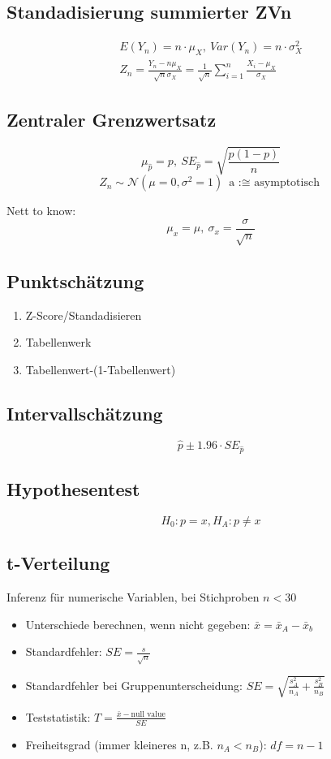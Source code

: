 \documentclass[10pt,a4paper,landscape]{article}
\begin{document}
\begin{multicols}{4}
\subsection{Standadisierung summierter ZVn}
\begin{align*}
E(Y_n) = n \cdot \mu_X, ~ Var(Y_n)= n \cdot \sigma_X^2 \\
Z_n = \frac{Y_n - n\mu_X}{\sqrt{n}\sigma_X}=\frac{1}{\sqrt{n}}\sum_{i=1}^n \frac{X_i-\mu_X}{\sigma_X}
\end{align*}

\subsection{Zentraler Grenzwertsatz}
\[
\mu_{\hat{p}}=p, ~SE_{\hat{p}}=\sqrt{\frac{p(1-p)}{n}}
\]
\[
Z_n \sim \mathcal{N}(\mu = 0, \sigma^2 = 1) ~ \text{a :$\cong$ asymptotisch}
\]

Nett to know:
\[
\mu_x = \mu, ~ \sigma_x = \frac{\sigma}{\sqrt{n}}
\]

\subsection{Punktschätzung}
\begin{enumerate}
\item Z-Score/Standadisieren
\item Tabellenwerk
\item Tabellenwert-(1-Tabellenwert)
\end{enumerate}

\subsection{Intervallschätzung}
\[
\hat{p} \pm 1.96 \cdot SE_{\hat{p}}
\]

\subsection{Hypothesentest}
\[
H_0 : p = x, H_A: p \neq x
\]

\subsection{t-Verteilung}
Inferenz für numerische Variablen, bei Stichproben $n < 30$

\begin{itemize}
\item Unterschiede berechnen, wenn nicht gegeben: $\bar{x} = \bar{x}_A - \bar{x}_b$
\item Standardfehler: $SE = \frac{s}{\sqrt{n}}$
\item Standardfehler bei Gruppenunterscheidung: $SE = \sqrt{\frac{s_A^2}{n_A} + \frac{s_B^2}{n_B}}$
\item Teststatistik: $T = \frac{\bar{x} - \text{null value}}{SE}$
\item Freiheitsgrad (immer kleineres n, z.B. $n_A < n_B$): $df = n - 1$
\end{itemize}

\end{multicols}
\end{document}
